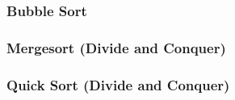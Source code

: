     \subsubsection{Bubble Sort}
    \subsubsection{Mergesort (Divide and Conquer)}
    \subsubsection{Quick Sort (Divide and Conquer)}